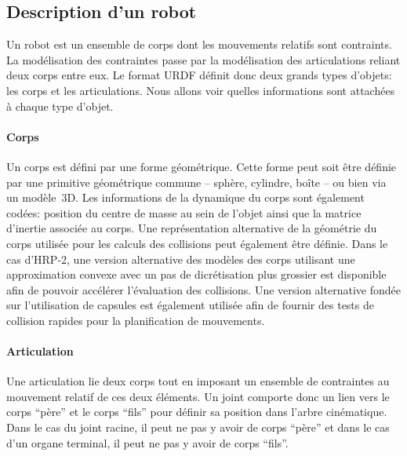 \subsection{Description d'un robot}


Un robot est un ensemble de corps dont les mouvements relatifs sont
contraints. La modélisation des contraintes passe par la modélisation
des articulations reliant deux corps entre eux. Le format URDF définit
donc deux grands types d'objets: les corps et les articulations. Nous
allons voir quelles informations sont attachées à chaque type d'objet.

\paragraph{Corps}

Un corps est défini par une forme géométrique. Cette forme peut soit
être définie par une primitive géométrique commune -- sphère,
cylindre, boîte -- ou bien via un modèle 3D. Les informations de la
dynamique du corps sont également codées: position du centre de
masse au sein de l'objet ainsi que la matrice d'inertie associée au
corps. Une représentation alternative de la géométrie du corps
utilisée pour les calculs des collisions peut également être
définie. Dans le cas d'HRP-2, une version alternative des modèles des
corps utilisant une approximation convexe avec un pas de dicrétisation
plus grossier est disponible afin de pouvoir accélérer l'évaluation
des collisions. Une version alternative fondée sur l'utilisation de
capsules est également utilisée afin de fournir des tests de collision
rapides pour la planification de mouvements.


\paragraph{Articulation}

Une articulation lie deux corps tout en imposant un ensemble de
contraintes au mouvement relatif de ces deux éléments. Un joint
comporte donc un lien vers le corps ``père'' et le corps ``fils'' pour
définir sa position dans l'arbre cinématique. Dans le cas du joint
racine, il peut ne pas y avoir de corps ``père'' et dans le cas d'un
organe terminal, il peut ne pas y avoir de corps ``fils''.

